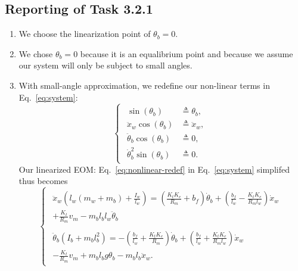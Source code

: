 \documentclass[11pt]{article} %
\begin{document}
\subsection*{Reporting of Task 3.2.1}
\begin{enumerate}
\item %
  We choose the linearization point of $\theta_b = 0$.
\item %
  We chose $\theta_b = 0$ because it is an equalibrium point and because we assume our system will only be subject to small angles.
\item %
  With small-angle approximation, we redefine our non-linear terms in Eq.~\eqref{eq:system}:
  \begin{equation}\label{eq:nonlinear-redef}
    \begin{cases}
      \begin{aligned}
        \sin(\theta_b) &\triangleq \theta_b, \\
        \ddot{x}_w \cos(\theta_b) &\triangleq \ddot{x}_w, \\
        \ddot{\theta}_b \cos(\theta_b) &\triangleq 0, \\
        \dot{\theta}_b^2 \sin(\theta_b) &\triangleq 0.
      \end{aligned}
    \end{cases}
  \end{equation}
  Our linearized \ac{EOM}: Eq.~\eqref{eq:nonlinear-redef}
  in Eq.~\eqref{eq:system} simplifed thus becomes
  \begin{equation}
    \begin{cases}
      \begin{aligned}
        \ddot{x}_w\left(l_w(m_w + m_b) + \frac{I_w}{l_w}\right) =
        \left(
          \frac{K_t K_e}{R_m}
          + b_f
        \right)\dot{\theta}_b
        +
        \left(
          \frac{b_f}{l_w}
          -
          \frac{K_t K_e}{R_m l_w}
        \right)\dot{x}_w
        \\
        + \frac{K_t}{R_m}v_m
        - m_b l_b l_w \ddot{\theta}_b
      \end{aligned}\\
      \begin{aligned}
        \ddot{\theta}_b\left(I_b + m_b l_b^2\right)
        =
        -\left(
          \frac{b_f}{l_w}
          +
          \frac{K_t K_e}{R_m}
        \right)\dot{\theta}_b
        + \left(
          \frac{b_f}{l_w} + \frac{K_t K_e}{R_m l_w}
        \right)\dot{x}_w
        \\
        - \frac{K_t}{R_m}v_m
        + m_b l_b g \theta_b
        - m_b l_b \ddot{x}_w.
      \end{aligned}
    \end{cases}
  \end{equation}
\end{enumerate}
\end{document}
